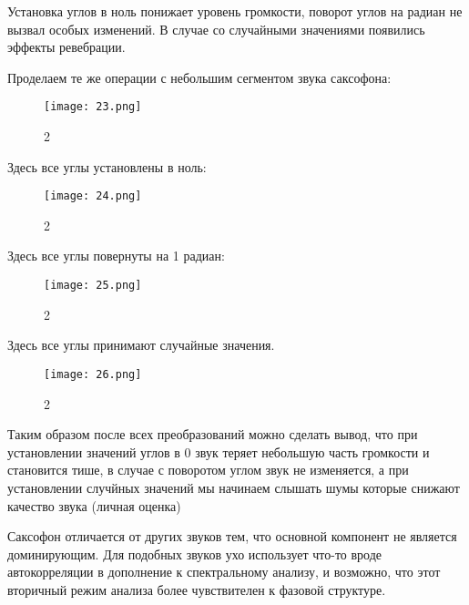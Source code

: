 \documentclass[10pt,a4paper,oneside]{article}
\begin{document}
Установка углов в ноль понижает уровень громкости, поворот углов на радиан не вызвал особых изменений. В случае со случайными значениями появились эффекты ревебрации.

Проделаем те же операции с небольшим сегментом звука саксофона:

\begin{figure}[H]
        \centering
        \texttt{[image: 23.png]}
        \caption{2}
        \label{fig:first}
\end{figure}

Здесь все углы установлены в ноль:

\begin{figure}[H]
        \centering
        \texttt{[image: 24.png]}
        \caption{2}
        \label{fig:first}
\end{figure}

Здесь все углы повернуты на 1 радиан: 

\begin{figure}[H]
        \centering
        \texttt{[image: 25.png]}
        \caption{2}
        \label{fig:first}
\end{figure}

Здесь все углы принимают случайные значения.

\begin{figure}[H]
        \centering
        \texttt{[image: 26.png]}
        \caption{2}
        \label{fig:first}
\end{figure}

Таким образом после всех преобразований можно сделать вывод, что при установлении значений углов в 0 звук теряет небольшую часть громкости и становится тише, в случае с поворотом углом звук не изменяется, а при установлении случйных значений мы начинаем слышать шумы которые снижают качество звука (личная оценка)

Саксофон отличается от других звуков тем, что основной компонент не является доминирующим. Для подобных звуков ухо использует что-то вроде автокорреляции в дополнение к спектральному анализу, и возможно, что этот вторичный режим анализа более чувствителен к фазовой структуре.
\end{document}
